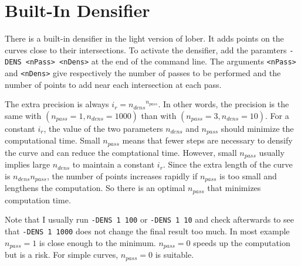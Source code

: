 \documentclass{article}
\begin{document}
\section{Built-In Densifier}

There is a built-in densifier in the light version of lober. It adds points on the curves close to their intersections. To activate the densifier, add the paramters \verb+-DENS <nPass> <nDens>+ at the end of the command line. The arguments \verb+<nPass>+ and \verb+<nDens>+ give respectively the number of passes to be performed and the number of points to add near each intersection at each pass. 

The extra precision is always $i_r = {n_{dens}}^{n_{pass}}$. In other words, the precision is the same with $(n_{pass}=1 , n_{dens}=1000)$ than with $(n_{pass}=3, n_{dens}=10)$. For a constant $i_r$, the value of the two parameters $n_{dens}$ and $n_{pass}$ should minimize the computational time. Small $n_{pass}$ means that fewer steps are necessary to densify the curve and can reduce the comptational time. However, small $n_{pass}$ usually implies large $n_{dens}$ to maintain a constant $i_r$. Since the extra length of the curve is $n_{dens} n_{pass}$, the number of points increases rapidly if $n_{pass}$ is too small and lengthens the computation. So there is an optimal $n_{pass}$ that minimizes computation time.

Note that I usually run \verb+-DENS 1 100+ or \verb+-DENS 1 10+ and check afterwards to see that \verb+-DENS 1 1000+ does not change the final result too much. In most example $n_{pass}=1$ is close enough to the minimum. $n_{pass}=0$ speeds up the computation but is a risk. For simple curves, $n_{pass}=0$ is suitable.
\end{document}
